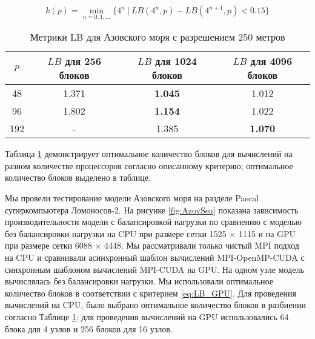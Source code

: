 \begin{equation} \label{eq:LB_GPU} 
k(p) = \min_{n=0,1,...} \{ 4^n ~|~ LB(4^{n}, p) - LB(4^{n+1}, p) < 0.15 \}
\end{equation}


\begin{table} [htbp]
\centering
\caption{Метрики LB для Азовского моря с разрешением 250 метров}\label{tab:CPULB}
	\begin{tabular}{cccc}
	$p$ & $LB$ для 256 блоков & $LB$ для 1024 блоков & $LB$ для 4096 блоков \\
    \hline
	48    &  1.371   &  \textbf{1.045}  &  1.012 \\
    96    &  1.802   &  \textbf{1.154}  &  1.022 \\
	192   &    -     &  1.385  &  \textbf{1.070} \\
	\hline
	\end{tabular}
\end{table}

Таблица \ref{tab:CPULB} демонстрирует оптимальное количество блоков для вычислений на разном количестве процессоров согласно описанному критерию; оптимальное количество блоков выделено в таблице.

Мы провели тестирование модели Азовского моря на разделе Pascal суперкомпьютера Ломоносов-2.
На рисунке \ref{fig:AzovSea} показана зависимость производительности модели с балансировкой нагрузки по сравнению с моделью без балансировки нагрузки на CPU при размере сетки 1525 $\times$ 1115 и на GPU при размере сетки 6088 $\times$ 4448.
Мы рассматривали только чистый MPI подход на CPU и сравнивали асинхронный шаблон вычислений MPI-OpenMP-CUDA с синхронным шаблоном вычислений MPI-CUDA на GPU.
На одном узле модель вычислялась без балансировки нагрузки.
Мы использовали оптимальное количество блоков в соответствии с критерием \ref{eq:LB_GPU}.
Для проведения вычислений на CPU, было выбрано оптимальное количество блоков в разбиении согласно Таблице \ref{tab:CPULB}; для проведения вычислений на GPU использовались 64 блока для 4 узлов и 256 блоков для 16 узлов.

